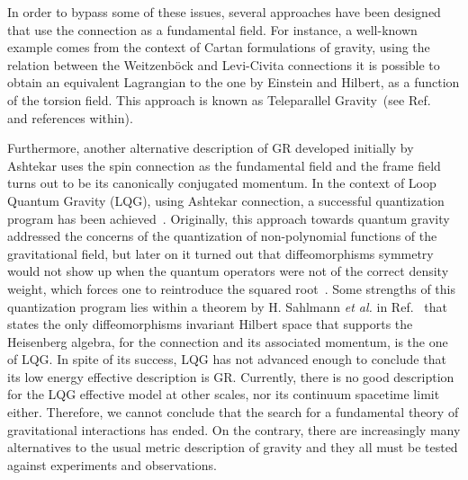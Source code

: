 \documentclass[twocolumn,aps,
  showpacs,showkeys,prd,superscriptaddress]{revtex4-1}
\renewcommand{\(}{\left(}
\renewcommand{\)}{\right)}
\renewcommand{\[}{\left[}
\renewcommand{\]}{\right]}
\begin{document}
In order to bypass some of these issues, several approaches have been designed that use the connection as a fundamental field. For instance, a well-known example comes from the context of Cartan formulations of gravity, using the relation between the Weitzenb\"ock and Levi-Civita connections it is possible to obtain an equivalent Lagrangian to the one by Einstein and Hilbert, as a function of the torsion field. This approach is known as Teleparallel Gravity~(see Ref.~\cite{Maluf:2013gaa,Teleparallel,Baez:2012bn} and references within).

Furthermore, another alternative description of GR developed initially by Ashtekar uses the spin connection as the fundamental field and the frame field turns out to be its canonically conjugated momentum. In the context of Loop Quantum Gravity (LQG), using Ashtekar connection, a successful quantization program has been achieved~\cite{Ashtekar:2004eh,thiemann2007loop}. Originally, this approach towards quantum gravity addressed the concerns of the quantization of non-polynomial functions of the gravitational field, but later on it turned out that diffeomorphisms symmetry would not show up when the quantum operators were not of the correct density weight, which forces one to reintroduce the squared root~\cite{Thiemann:1996aw}.  Some  strengths of this quantization program lies within a theorem by H. Sahlmann \emph{et al.} in Ref.~\cite{Lewandowski:2005jk} that states the only diffeomorphisms invariant Hilbert space that supports the Heisenberg algebra, for the connection and its associated momentum, is the one of LQG. In spite of its success, LQG has not advanced enough to conclude that its low energy effective description is GR. Currently, there is no good description for the LQG effective model at other scales,  nor its continuum spacetime limit either. Therefore, we cannot conclude that the search for a fundamental theory of gravitational interactions has ended. On the contrary, there are increasingly many alternatives to the usual metric description of gravity and they all must be tested against experiments and observations.
\end{document}
